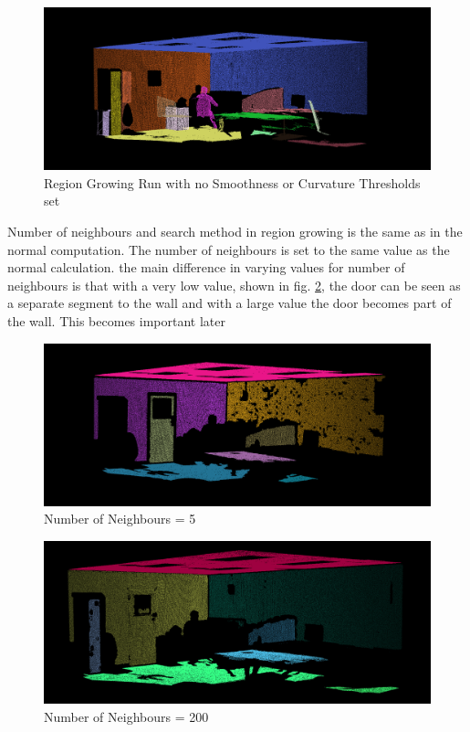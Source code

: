 		
		\begin{figure}[H]
			\centering
			\includegraphics[width=1\linewidth]{Includes/images/RegionGrowing/NoSmoothCurv}
			\caption{Region Growing Run with no Smoothness or Curvature Thresholds set}
			\label{fig:NoSmoothCurv}
		\end{figure}
	
		Number of neighbours and search method in region growing is the same as in the normal computation. The number of neighbours is set to the same value as the normal calculation. the main difference in varying values for number of neighbours is that with a very low value, shown in fig. \ref{fig:neighbours-5}, the door can be seen as a separate segment to the wall and with a large value the door becomes part of the wall. This becomes important later 
		
		
		\begin{figure}[H]
			\centering
			\includegraphics[width=1\linewidth]{Includes/images/RegionGrowing/neighbours-5}
			\caption{Number of Neighbours = 5}
			\label{fig:neighbours-5}
		\end{figure}
		
		\begin{figure}[H]
			\centering
			\includegraphics[width=1\linewidth]{Includes/images/RegionGrowing/neighbours-200}
			\caption{Number of Neighbours = 200}
			\label{fig:neighbours-200}
		\end{figure}

